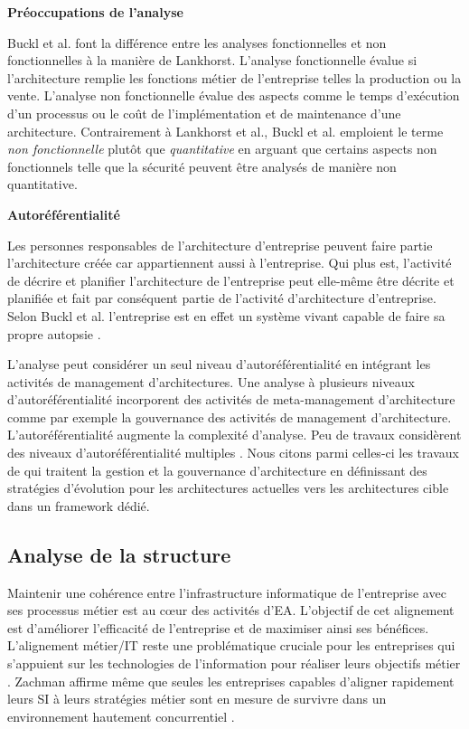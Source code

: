 \begin{description}
	\item \textbf{Préoccupations de l'analyse}

Buckl et al. font la différence entre les analyses fonctionnelles et non 
fonctionnelles à la manière de Lankhorst. L'analyse fonctionnelle évalue si 
l'architecture remplie les fonctions métier de l'entreprise telles la production 
ou la vente. L'analyse non fonctionnelle évalue des aspects comme le temps 
d'exécution d'un processus ou le coût de l'implémentation et de maintenance 
d'une architecture. Contrairement à Lankhorst et al., Buckl et al. emploient le 
terme \textit{non fonctionnelle} plutôt que \textit{quantitative} en arguant que 
certains aspects non fonctionnels telle que la sécurité peuvent être analysés de 
manière non quantitative. 

	\item \textbf{Autoréférentialité}
	
Les personnes responsables de l'architecture d'entreprise peuvent faire partie 
l'architecture créée car appartiennent aussi à l'entreprise. Qui plus est, 
l'activité de décrire et planifier l'architecture de l'entreprise peut elle-même 
être décrite et planifiée et fait par conséquent partie de l'activité 
d'architecture d'entreprise. Selon Buckl et al. \cite{varela1974autopoiesis} 
l'entreprise est en effet un système vivant capable de faire sa propre autopsie 
\cite{varela1974autopoiesis}.

L'analyse peut considérer un seul niveau d'autoréférentialité en intégrant les 
activités de management d'architectures. Une analyse à plusieurs niveaux 
d'autoréférentialité incorporent des activités de meta-management d'architecture 
comme par exemple la gouvernance des activités de management d'architecture.
L'autoréférentialité augmente la complexité d'analyse. Peu de travaux 
considèrent des niveaux d'autoréférentialité multiples 
\cite{smook2014executable}. Nous citons parmi celles-ci les travaux de 
\cite{metrailler_evolis_2014} qui traitent la gestion et la gouvernance 
d'architecture en définissant des stratégies d'évolution pour les architectures 
actuelles vers les architectures cible dans un framework dédié. 

\end{description}

	\subsection{Analyse de la structure}
	Maintenir une cohérence entre l'infrastructure informatique de l'entreprise 
avec ses processus métier est au cœur des activités 
d'EA\cite{lankhorst2013enterprise}. L'objectif de cet alignement est d'améliorer 
l'efficacité de l'entreprise et de maximiser ainsi ses bénéfices. L'alignement 
métier/IT reste une problématique cruciale pour les entreprises qui s'appuient 
sur les technologies de l'information pour réaliser leurs objectifs métier 
\cite{kaisler_enterprise_2005}. Zachman affirme même que seules les entreprises 
capables d'aligner rapidement leurs SI à leurs stratégies métier sont en mesure 
de survivre dans un environnement hautement concurrentiel 
\cite{zachman1997enterprise}.
	
